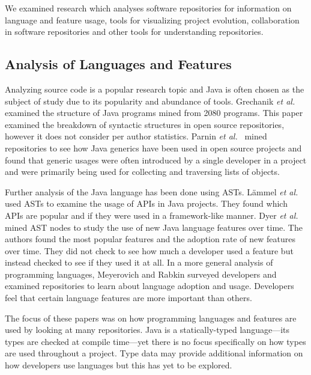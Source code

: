 We examined research which analyses software repositories for information on language and feature usage, tools for visualizing project evolution, collaboration in software repositories and other tools for understanding repositories.

\subsection{Analysis of Languages and Features}

Analyzing source code is a popular research topic and Java is often chosen as the subject of study due to its popularity and abundance of tools. Grechanik \textit{et al.}~\cite{Grechanik:2010:EIL:1852786.1852801} examined the structure of Java programs mined from 2080 programs. This paper examined the breakdown of syntactic structures in open source repositories, however it does not consider per author statistics. Parnin \textit{et al.}~\cite{Parnin:2011:JGA:1985441.1985446} mined repositories to see how Java generics have been used in open source projects and found that generic usages were often introduced by a single developer in a project and were primarily being used for collecting and traversing lists of objects.

Further analysis of the Java language has been done using ASTs. L\"{a}mmel \textit{et al.}~\cite{Lammel:2011:LAA:1982185.1982471} used ASTs to examine the usage of APIs in Java projects. They found which APIs are popular and if they were used in a framework-like manner. Dyer \textit{et al.}~\cite{Dyer:2014:MBA:2568225.2568295} mined AST nodes to study the use of new Java language features over time. The authors found the most popular features and the adoption rate of new features over time. They did not check to see how much a developer used a feature but instead checked to see if they used it at all. In a more general analysis of programming languages, Meyerovich and Rabkin \cite{Meyerovich:2013:EAP:2509136.2509515} surveyed developers and examined repositories to learn about language adoption and usage. Developers feel that certain language features are more important than others.

The focus of these papers was on how programming languages and features are used by looking at many repositories. Java is a statically-typed language---its types are checked at compile time---yet there is no focus specifically on how types are used throughout a project. Type data may provide additional information on how developers use languages but this has yet to be explored.

